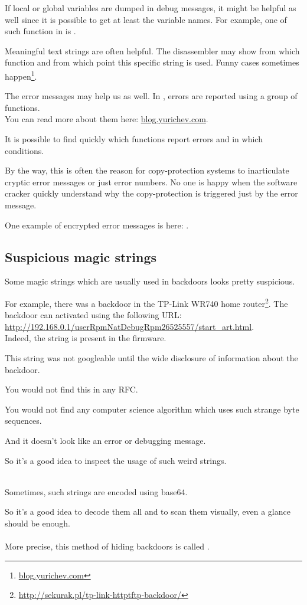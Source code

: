 If local or global variables are dumped in debug messages, it might be helpful as well 
since it is possible to get at least the variable names.
For example, one of such function in \oracle is .

Meaningful text strings are often helpful.
The \IDA disassembler may show from which function and from which point this specific string is used.
Funny cases sometimes happen\footnote{\href{http://go.yurichev.com/17223}{blog.yurichev.com}}.

The error messages may help us as well.
In \oracle, errors are reported using a group of functions.\\
You can read more about them here: \href{http://go.yurichev.com/17224}{blog.yurichev.com}.


It is possible to find quickly which functions report errors and in which conditions.

By the way, this is often the reason for copy-protection systems to inarticulate cryptic error messages 
or just error numbers. No one is happy when the software cracker quickly understand why the copy-protection
is triggered just by the error message.

One example of encrypted error messages is here: .

\subsection{Suspicious magic strings}

Some magic strings which are usually used in backdoors looks pretty suspicious.

For example, there was a backdoor in the TP-Link WR740 home router\footnote{\url{http://sekurak.pl/tp-link-httptftp-backdoor/}}.
The backdoor can activated using the following URL:\\
\url{http://192.168.0.1/userRpmNatDebugRpm26525557/start_art.html}.\\

Indeed, the  string is present in the firmware.

This string was not googleable until the wide disclosure of information about the backdoor.

You would not find this in any \ac{RFC}.

You would not find any computer science algorithm which uses such strange byte sequences.

And it doesn't look like an error or debugging message.

So it's a good idea to inspect the usage of such weird strings.\\
\\

Sometimes, such strings are encoded using base64.

So it's a good idea to decode them all and to scan them visually, even a glance should be enough.\\
\\
More precise, this method of hiding backdoors is called .


